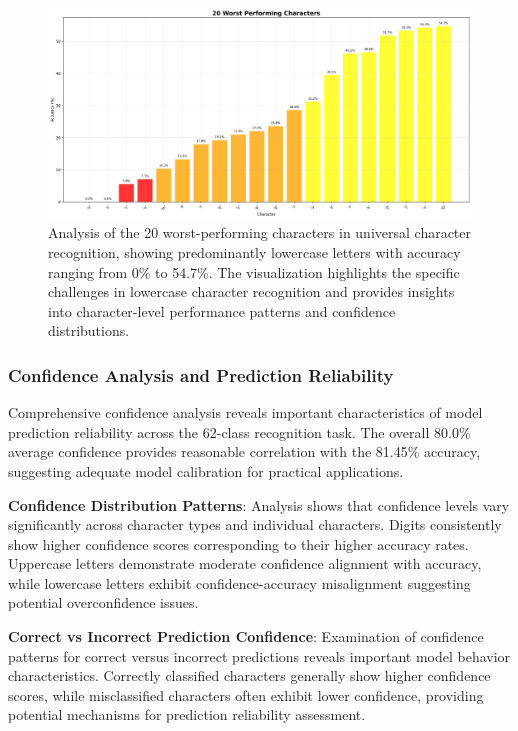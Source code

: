 \documentclass[11pt,a4paper]{report}
\begin{document}
\begin{figure}[H]
\centering
\includegraphics[width=\textwidth]{worst_characters.png}
\caption{Analysis of the 20 worst-performing characters in universal character recognition, showing predominantly lowercase letters with accuracy ranging from 0\% to 54.7\%. The visualization highlights the specific challenges in lowercase character recognition and provides insights into character-level performance patterns and confidence distributions.}
\label{fig:worst_characters}
\end{figure}

\subsubsection{Confidence Analysis and Prediction Reliability}

Comprehensive confidence analysis reveals important characteristics of model prediction reliability across the 62-class recognition task. The overall 80.0\% average confidence provides reasonable correlation with the 81.45\% accuracy, suggesting adequate model calibration for practical applications.

\textbf{Confidence Distribution Patterns}: Analysis shows that confidence levels vary significantly across character types and individual characters. Digits consistently show higher confidence scores corresponding to their higher accuracy rates. Uppercase letters demonstrate moderate confidence alignment with accuracy, while lowercase letters exhibit confidence-accuracy misalignment suggesting potential overconfidence issues.

\textbf{Correct vs Incorrect Prediction Confidence}: Examination of confidence patterns for correct versus incorrect predictions reveals important model behavior characteristics. Correctly classified characters generally show higher confidence scores, while misclassified characters often exhibit lower confidence, providing potential mechanisms for prediction reliability assessment.
\end{document}
